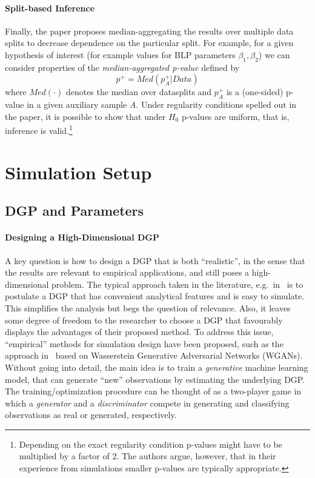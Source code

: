 \documentclass[11pt, a4paper, leqno]{article}
\begin{document}
\paragraph*{Split-based Inference}
Finally, the paper proposes median-aggregating the results over multiple data splits to decrease dependence on the particular split.
For example, for a given hypothesis of interest (for example values for BLP parameters $\beta_1, \beta_2$) we can consider properties of the \textit{median-aggregated p-value} defined by
\begin{equation*}
    p^+ = Med(p_A^+|Data)
\end{equation*}
where $Med(\cdot)$ denotes the median over datasplits and $p_A^+$ is a (one-sided) p-value in a given auxiliary sample $A$.
Under regularity conditions spelled out in the paper, it is possible to show that under $H_0$ p-values are uniform, that is, inference is valid.\footnote{Depending on the exact regularity condition p-values might have to be multiplied by a factor of 2. The authors argue, however, that in their experience from simulations smaller p-values are typically appropriate.}
\section{Simulation Setup}

\subsection{DGP and Parameters}
\paragraph*{Designing a High-Dimensional DGP}
A key question is how to design a DGP that is both ``realistic'', in the sense that the results are relevant to empirical applications, and still poses a high-dimensional problem.
The typical approach taken in the literature, e.g.\ in~\citet{wager2018estimation} is to postulate a DGP that has convenient analytical features and is easy to simulate.
This simplifies the analysis but begs the question of relevance. Also, it leaves some degree of freedom to the researcher to choose a DGP that favourably displays the advantages of their proposed method.
To address this issue, ``empirical'' methods for simulation design have been proposed, such as the approach in~\citet{athey2024wgan} based on Wasserstein Generative Adversarial Networks (WGANs).
Without going into detail, the main idea is to train a \textit{generative} machine learning model, that can generate ``new'' observations by estimating the underlying DGP\@.
The training/optimization procedure can be thought of as a two-player game in which a \textit{generator} and a \textit{discriminator} compete in generating and classifying observations as real or generated, respectively.
\end{document}
